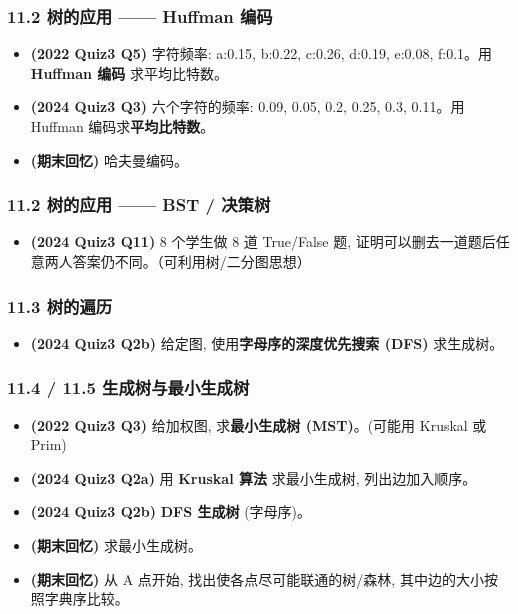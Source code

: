 \documentclass[10pt,a4paper,openany]{ctexbook}
\theoremstyle{definition}
\theoremstyle{remark}
\begin{document}
\subsubsection{11.2 树的应用 —— Huffman 编码}

\begin{itemize}
\item \textbf{(2022 Quiz3 Q5)} 字符频率: a:0.15, b:0.22, c:0.26, d:0.19, e:0.08, f:0.1。用 \textbf{Huffman 编码} 求平均比特数。
\item \textbf{(2024 Quiz3 Q3)} 六个字符的频率: 0.09, 0.05, 0.2, 0.25, 0.3, 0.11。用 Huffman 编码求\textbf{平均比特数}。
\item \textbf{(期末回忆)} 哈夫曼编码。

\end{itemize}

\subsubsection{11.2 树的应用 —— BST / 决策树}

\begin{itemize}
\item \textbf{(2024 Quiz3 Q11)} 8 个学生做 8 道 True/False 题, 证明可以删去一道题后任意两人答案仍不同。（可利用树/二分图思想）

\end{itemize}

\subsubsection{11.3 树的遍历}

\begin{itemize}
\item \textbf{(2024 Quiz3 Q2b)} 给定图, 使用\textbf{字母序的深度优先搜索 (DFS)} 求生成树。

\end{itemize}

\subsubsection{11.4 / 11.5 生成树与最小生成树}

\begin{itemize}
\item \textbf{(2022 Quiz3 Q3)} 给加权图, 求\textbf{最小生成树 (MST)}。(可能用 Kruskal 或 Prim)
\item \textbf{(2024 Quiz3 Q2a)} 用 \textbf{Kruskal 算法} 求最小生成树, 列出边加入顺序。
\item \textbf{(2024 Quiz3 Q2b)} \textbf{DFS 生成树} (字母序)。
\item \textbf{(期末回忆)} 求最小生成树。
\item \textbf{(期末回忆)} 从 A 点开始, 找出使各点尽可能联通的树/森林, 其中边的大小按照字典序比较。

\end{itemize}
\end{document}
